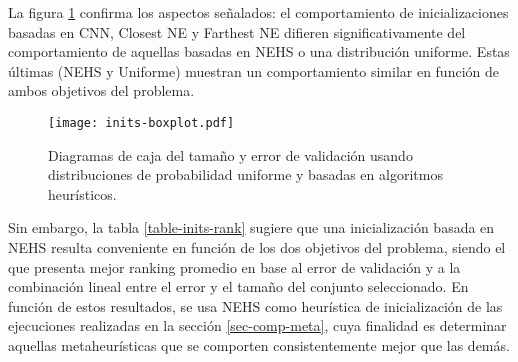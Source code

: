 La figura \ref{fig-inits} confirma los aspectos señalados: el comportamiento de inicializaciones basadas en CNN, Closest NE y Farthest NE difieren significativamente del comportamiento de aquellas basadas en NEHS o una distribución uniforme. Estas últimas (NEHS y Uniforme) muestran un comportamiento similar en función de ambos objetivos del problema.%

\begin{figure}[h!]
\centering
\texttt{[image: inits-boxplot.pdf]}
\caption[Tamaño y error de validación usando algoritmos heurísticos]{Diagramas de caja del tamaño y error de validación usando distribuciones de probabilidad uniforme y basadas en algoritmos heurísticos.}
\label{fig-inits}
\end{figure}

Sin embargo, la tabla \ref{table-inits-rank} sugiere que una inicialización basada en NEHS resulta conveniente en función de los dos objetivos del problema, siendo el que presenta mejor ranking promedio en base al error de validación y a la combinación lineal entre el error y el tamaño del conjunto seleccionado. En función de estos resultados, se usa NEHS como heurística de inicialización de las ejecuciones realizadas en la sección \ref{sec-comp-meta}, cuya finalidad es determinar aquellas metaheurísticas que se comporten consistentemente mejor que las demás.

